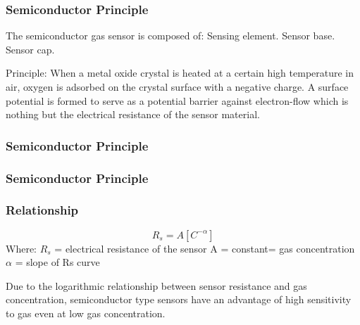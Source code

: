 \documentclass{beamer}
\begin{document}
\begin{frame}
\frametitle{Semiconductor Principle}
The semiconductor gas sensor is composed of:\newline
Sensing element.\newline
Sensor base.\newline
Sensor cap.\newline

Principle:\newline
When a metal oxide crystal is heated at a certain high temperature in air, oxygen is adsorbed on the crystal surface with a negative charge. A surface potential is formed to serve as a potential barrier against electron-flow which is nothing but the electrical resistance of the sensor material.
\end{frame}

\begin{frame}
\frametitle{Semiconductor Principle}
\end{frame}

\begin{frame}
\frametitle{Semiconductor Principle}
\end{frame}

\begin{frame}
\frametitle{Relationship}
\begin{equation}\label{1}
R_{s} = A[C^{-\alpha}]
\end{equation}\newline
Where: $R_{s}$ = electrical resistance of the sensor\newline
A = constant\newline
[C] = gas concentration\newline
$\alpha$ = slope of Rs curve
\newline

Due to the logarithmic relationship between sensor resistance and gas concentration, semiconductor type sensors have an advantage of high sensitivity to gas even at low gas concentration.
\end{frame}
\end{document}
